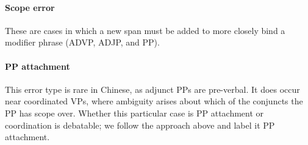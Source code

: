 \paragraph{Scope error}
These are cases in which a new span must be added to
more closely bind a modifier phrase (ADVP, ADJP, and PP).

\paragraph{PP attachment} 
This error type is rare in Chinese, as adjunct PPs are pre-verbal.  It does
occur near coordinated VPs, where ambiguity arises about which of the conjuncts
the PP has scope over.  Whether this particular case is PP attachment or
coordination is debatable; we follow the approach above and
label it PP attachment.

